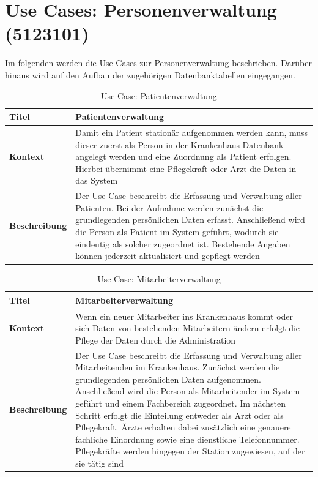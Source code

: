 \section{Use Cases: Personenverwaltung (5123101)}
	Im folgenden werden die Use Cases zur Personenverwaltung beschrieben. Darüber hinaus wird auf den Aufbau der zugehörigen Datenbanktabellen eingegangen.

\begin{table}[h]
\centering
\renewcommand{\arraystretch}{1.4}
\begin{tabularx}{\textwidth}{|p{4cm}|X|}
\hline
\textbf{Titel} & \textbf{Patientenverwaltung} \\
\hline
\textbf{Kontext} & 
Damit ein Patient stationär aufgenommen werden kann, muss dieser zuerst als Person in der Krankenhaus Datenbank angelegt werden und eine Zuordnung als Patient erfolgen. Hierbei übernimmt eine Pflegekraft oder Arzt die Daten in das System \\
\hline
\textbf{Beschreibung} & 
Der Use Case beschreibt die Erfassung und Verwaltung aller Patienten. Bei der Aufnahme werden zunächst die grundlegenden persönlichen Daten erfasst. Anschließend wird die Person als Patient im System geführt, wodurch sie eindeutig als solcher zugeordnet ist. Bestehende Angaben können jederzeit aktualisiert und gepflegt werden \\
\hline
\end{tabularx}
\caption{Use Case: Patientenverwaltung}
\label{tab:usecase_patient}
\end{table}

\newpage

\begin{table}[h]
\centering
\renewcommand{\arraystretch}{1.4}
\begin{tabularx}{\textwidth}{|p{4cm}|X|}
\hline
\textbf{Titel} & \textbf{Mitarbeiterverwaltung} \\
\hline
\textbf{Kontext} & 
Wenn ein neuer Mitarbeiter ins Krankenhaus kommt oder sich Daten von bestehenden Mitarbeitern ändern erfolgt die Pflege der Daten durch die Administration \\
\hline
\textbf{Beschreibung} & 
Der Use Case beschreibt die Erfassung und Verwaltung aller Mitarbeitenden im Krankenhaus. Zunächst werden die grundlegenden persönlichen Daten aufgenommen. Anschließend wird die Person als Mitarbeitender im System geführt und einem Fachbereich zugeordnet. Im nächsten Schritt erfolgt die Einteilung entweder als Arzt oder als Pflegekraft. Ärzte erhalten dabei zusätzlich eine genauere fachliche Einordnung sowie eine dienstliche Telefonnummer. Pflegekräfte werden hingegen der Station zugewiesen, auf der sie tätig sind \\
\hline
\end{tabularx}
\caption{Use Case: Mitarbeiterverwaltung}
\label{tab:usecase_employee}
\end{table}

